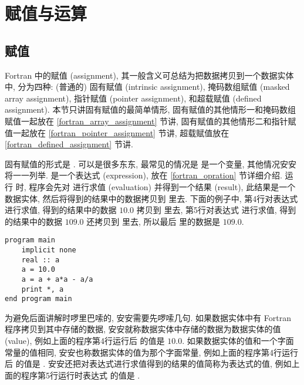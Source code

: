 \chapter{赋值与运算}

\section{赋值}\label{fortran_assignment}

Fortran 中的赋值 (assignment), 其一般含义可总结为把数据拷贝到一个数据实体中, 分为四种: (普通的) 固有赋值 (intrinsic assignment), 掩码数组赋值 (masked array assignment), 指针赋值 (pointer assignment), 和超载赋值 (defined assignment). 本节只讲固有赋值的最简单情形, 固有赋值的其他情形一和掩码数组赋值一起放在 \ref{fortran_array_assignment} 节讲, 固有赋值的其他情形二和指针赋值一起放在 \ref{fortran_pointer_assignment} 节讲, 超载赋值放在 \ref{fortran_defined_assignment} 节讲.

固有赋值的形式是 \ttt{[var] = [expr]}. \ttt{[var]} 可以是很多东东, 最常见的情况是 \ttt{[var]} 是一个变量, 其他情况安安将一一列举. \ttt{[expr]} 是一个表达式 (expression), 放在 \ref{fortran_opration} 节详细介绍. 运行 \ttt{[var] = [expr]} 时, 程序会先对 \ttt{[expr]} 进行求值 (evaluation) 并得到一个结果 (result), 此结果是一个数据实体, 然后将得到的结果中的数据拷贝到 \ttt{[var]} 里去. 下面的例子中, 第4行对表达式  进行求值, 得到的结果中的数据 $10.0$ 拷贝到  里去, 第5行对表达式  进行求值, 得到的结果中的数据 $109.0$ 还拷贝到  里去, 所以最后  里的数据是 $109.0$.
\begin{lstlisting}
program main
    implicit none
    real :: a
    a = 10.0
    a = a + a*a - a/a
    print *, a
end program main
\end{lstlisting}

为避免后面讲解时啰里巴嗦的, 安安需要先啰嗦几句. 如果数据实体中有 Fortran 程序拷贝到其中存储的数据, 安安就称数据实体中存储的数据为数据实体的值 (value), 例如上面的程序第4行运行后  的值是 $10.0$. 如果数据实体的值和一个字面常量的值相同, 安安也称数据实体的值为那个字面常量, 例如上面的程序第4行运行后  的值是 . 安安还把对表达式进行求值得到的结果的值简称为表达式的值, 例如上面的程序第5行运行时表达式  的值是 .

